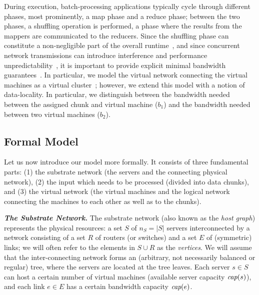 \documentclass[conference,10pt]{IEEEtran}
\newcommand{\capacity}{\emph{cap}}
\newcommand{\CostTrans}{\ensuremath{b_1}}
\newcommand{\CostCom}{\ensuremath{b_2}}
\begin{document}
During execution, batch-processing applications typically cycle through different phases,
most prominently, a map phase and a reduce phase; between the two phases,
a shuffling operation is performed, a phase where the results from the mappers
are communicated to the reducers. Since the shuffling phase can constitute a
non-negligible part of the overall runtime~\cite{orchestra},
and since concurrent network transmissions can introduce interference and
performance unpredictability~\cite{amazonbw}, it is important
to provide explicit minimal bandwidth guarantees~\cite{talk-about}.
In particular, we model the virtual network connecting the virtual machines
as a virtual cluster~\cite{oktopus,talk-about,proteus};
however, we extend this model with a notion of data-locality.
In particular, we distinguish between the bandwidth needed between the assigned chunk
and virtual machine ($\CostTrans$) and the bandwidth needed between
two virtual machines ($\CostCom$). 

\subsection{Formal Model}

Let us now introduce our model more formally. It consists of three fundamental parts: (1) the substrate network (the servers
and the connecting physical network),
(2) the input which needs to be processed (divided into data chunks), and
(3) the virtual network (the virtual machines and the logical network connecting the machines to each other
as well as to the chunks).

\textbf{\emph{The Substrate Network.}} The substrate network (also known as the \emph{host graph}) represents the physical resources:
a set $S$ of $n_S=|S|$ servers interconnected by a network consisting of a set $R$ of routers (or switches)
and a set $E$ of (symmetric) links; we will often refer to the elements in $S\cup R$
as the \emph{vertices}. We will assume that the inter-connecting network forms an (arbitrary, not necessarily balanced
or regular) tree,
where the servers are located at the tree leaves.
Each server $s\in S$ can host a certain number
of virtual machines (available server capacity $\capacity(s)$), and each link $e\in E$ has a certain bandwidth
capacity $\capacity(e)$.
\end{document}
